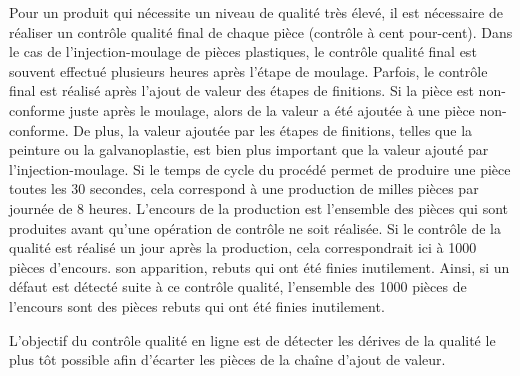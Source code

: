 
Pour un produit qui nécessite un niveau de qualité très élevé, il est nécessaire de réaliser un contrôle qualité final de chaque pièce (contrôle à cent pour-cent).
Dans le cas de l'injection-moulage de pièces plastiques, le contrôle qualité final est souvent effectué plusieurs heures après l’étape de moulage.
Parfois, le contrôle final est réalisé après l’ajout de valeur des étapes de finitions.  %
Si la pièce est non-conforme juste après le moulage, alors de la valeur a été ajoutée à une pièce non-conforme.
De plus, la valeur ajoutée par les étapes de finitions, telles que la peinture ou la galvanoplastie, est bien plus important que la valeur ajouté par l'injection-moulage.
Si le temps de cycle du procédé permet de produire une pièce toutes les 30 secondes, cela correspond à une production de milles pièces par journée de 8 heures.
L'encours de la production est l'ensemble des pièces qui sont produites avant qu'une opération de contrôle ne soit réalisée.
Si le contrôle de la qualité est réalisé un jour après la production, cela correspondrait ici à 1000 pièces d'encours.
son apparition, rebuts qui ont été finies inutilement.
Ainsi, si un défaut est détecté suite à ce contrôle qualité, l'ensemble des 1000 pièces de l'encours sont des pièces rebuts qui ont été finies inutilement.

L’objectif du contrôle qualité en ligne est de détecter les dérives de la qualité le plus tôt possible afin d'écarter les pièces de la chaîne d'ajout de valeur.

